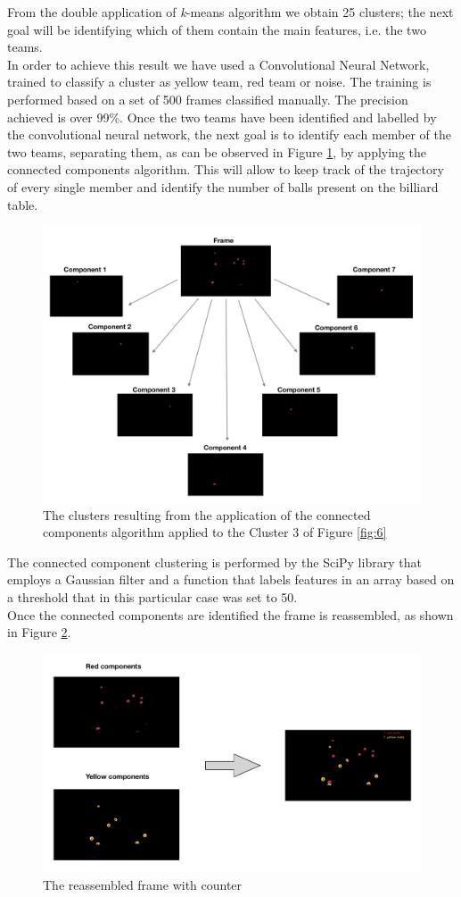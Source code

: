 \documentclass{usiinftr}
\begin{document}
\noindent
From the double application of \textit{k}-means algorithm we obtain 25 clusters; the next goal will be identifying which of them contain the main features, i.e. the two teams. \\
In order to achieve this result we have used a Convolutional Neural Network, trained to classify a cluster as yellow team, red team or noise. The training is performed based on a set of 500 frames classified manually. The precision achieved is over 99\%.
\newpage
\noindent
Once the two teams have been identified and labelled by the convolutional neural network, the next goal is to identify each member of the two teams, separating them, as can be observed in Figure \ref{fig:7}, by applying the connected components algorithm. This will allow to keep track of the trajectory of every single member and identify the number of balls present on the billiard table.
\begin{figure}[h]
	\centering
	\includegraphics[width=0.7\linewidth]{./img/cc}
	\caption{The clusters resulting from the application of the connected components algorithm applied to the Cluster 3 of Figure \ref{fig:6}}
	\label{fig:7}
\end{figure}

\noindent
The connected component clustering is performed by the SciPy library that employs a Gaussian filter and a function that labels features in an array based on a threshold that in this particular case was set to 50. \\
Once the connected components are identified the frame is reassembled, as shown in Figure \ref{fig:8}. 
\begin{figure}[h]
	\centering
	\includegraphics[width=0.7\linewidth]{./img/to_frame}
	\caption{The reassembled frame with counter}
	\label{fig:8}
\end{figure}
\end{document}
